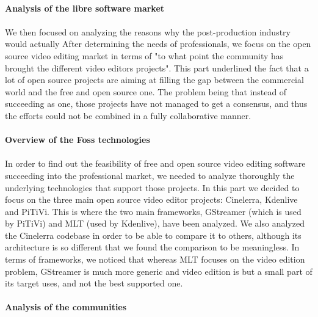\paragraph{Analysis of the libre software market}

\paragraph{}

We then focused on analyzing the reasons why the post-production industry
would actually After determining the needs of professionals, we focus
on the open source video editing market in terms of "to what point
the community has brought the different video editors projects". This
part underlined the fact that a lot of open source projects are aiming
at filling the gap between the commercial world and the free and open
source one. The problem being that instead of succeeding as one, those
projects have not managed to get a consensus, and thus the efforts could
not be combined in a fully collaborative manner.

\paragraph{Overview of the Foss technologies}

\paragraph{}

In order to find out the feasibility of free and open source video editing
software succeeding into the professional market, we needed to analyze
thoroughly the underlying technologies that support those projects.
In this part we decided to focus on the three main open source video
editor projects: Cinelerra, Kdenlive and PiTiVi.  This is where the two
main frameworks, GStreamer (which is used by PiTiVi) and MLT (used by
Kdenlive), have been analyzed. We also analyzed the Cinelerra codebase
in order to be able to compare it to others, although its architecture
is so different that we found the comparison to be meaningless. In terms
of frameworks, we noticed that whereas MLT focuses on the video edition
problem, GStreamer is much more generic and video edition is but a small
part of its target uses, and not the best supported one.

\paragraph{Analysis of the communities}

